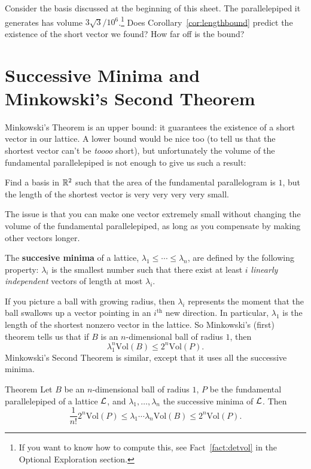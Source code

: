 \begin{explor}
	Consider the basis discussed at the beginning of this sheet. The parallelepiped it generates has volume $3\sqrt{3}/10^6$.\footnote{If you want to know how to compute this, see Fact~\ref{fact:detvol} in the Optional Exploration section.} Does Corollary~\ref{cor:lengthbound} predict the existence of the short vector we found? How far off is the bound?
\end{explor}

\section*{Successive Minima and Minkowski's Second Theorem}

Minkowski's Theorem is an upper bound: it guarantees the existence of a short vector in our lattice. A lower bound would be nice too (to tell us that the shortest vector can't be \emph{toooo} short), but unfortunately the volume of the fundamental parallelepiped is not enough to give us such a result:
\begin{explor}
	Find a basis in $\mathbb{R}^2$ such that the area of the fundamental parallelogram is $1$, but the length of the shortest vector is very very very very small.
\end{explor}
The issue is that you can make one vector extremely small without changing the volume of the fundamental parallelepiped, as long as you compensate by making other vectors longer.

\begin{defn}
The \textbf{succesive minima} of a lattice, $\lambda_1\leq\cdots\leq\lambda_n$, are defined by the following property: $\lambda_i$ is the smallest number such that there exist at least $i$ \emph{linearly independent} vectors of length at most $\lambda_i$. 
\end{defn}
If you picture a ball with growing radius, then $\lambda_i$ represents the moment that the ball swallows up a vector pointing in an $i^\text{th}$ new direction. In particular, $\lambda_1$ is the length of the shortest nonzero vector in the lattice. So Minkowski's (first) theorem tells us that if $B$ is an $n$-dimensional ball of radius $1$, then
\[\lambda_1^n\text{Vol}(B)\leq 2^n\text{Vol}(P).\]
Minkowski's Second Theorem is similar, except that it uses all the successive minima.
\begin{toprove}{Theorem}\label{thm:minkowski2}
	Let $B$ be an $n$-dimensional ball of radius $1$, $P$ be the fundamental parallelepiped of a lattice $\mathcal{L}$, and $\lambda_1,\ldots,\lambda_n$ the successive minima of $\mathcal{L}$. Then
	\[\frac{1}{n!}2^n\text{Vol}(P)\leq \lambda_1\cdots\lambda_n\text{Vol}(B)\leq 2^n\text{Vol}(P).\]
\end{toprove}

